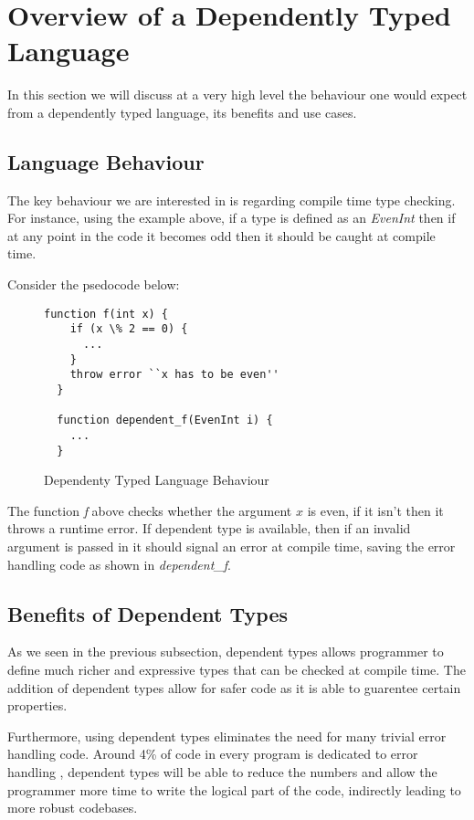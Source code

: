\documentclass[a4paper,12pt]{report}
\begin{document}
\section{Overview of a Dependently Typed Language}
In this section we will discuss at a very high level the behaviour one would 
expect from a dependently typed language, its benefits and use cases.

\subsection{Language Behaviour}
The key behaviour we are interested in is regarding compile time type checking. 
For instance, using the example above, if a type is defined as an \textit{EvenInt} 
then if at any point in the code it becomes odd then it should be caught at 
compile time. 

\par
Consider the psedocode below: 
\begin{figure}[H]
  \begin{lstlisting}[mathescape=true] 
  function f(int x) {
    if (x \% 2 == 0) {
      ...
    }
    throw error ``x has to be even''
  }
  
  function dependent_f(EvenInt i) {
    ...
  }
  \end{lstlisting}
  \caption{Dependenty Typed Language Behaviour}
\end{figure}

\par
The function \textit{f} above checks whether the argument $x$ is even, if it 
isn't then it throws a runtime error. If dependent type is available, then if an 
invalid argument is passed in it should signal an error at compile time, saving the 
error handling code as shown in \textit{dependent\_f}. 

\subsection{Benefits of Dependent Types}
As we seen in the previous subsection, dependent types allows programmer to 
define much richer and expressive types that can be checked at compile time. The 
addition of dependent types allow for safer code as it is able to guarentee certain 
properties. 

\par
Furthermore, using dependent types eliminates the need for many trivial error 
handling code. Around 4\% of code in every program is dedicated to error 
handling \cite{errorHandlingCode}, dependent types will be able to reduce the 
numbers and allow the programmer more time to write the logical part of the 
code, indirectly leading to more robust codebases.
\end{document}
